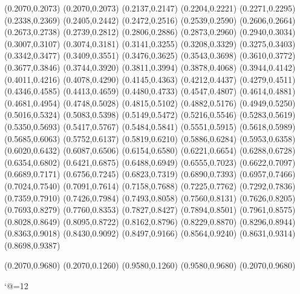 \PST@Dotted(0.2070,0.2073)
(0.2070,0.2073)
(0.2137,0.2147)
(0.2204,0.2221)
(0.2271,0.2295)
(0.2338,0.2369)
(0.2405,0.2442)
(0.2472,0.2516)
(0.2539,0.2590)
(0.2606,0.2664)
(0.2673,0.2738)
(0.2739,0.2812)
(0.2806,0.2886)
(0.2873,0.2960)
(0.2940,0.3034)
(0.3007,0.3107)
(0.3074,0.3181)
(0.3141,0.3255)
(0.3208,0.3329)
(0.3275,0.3403)
(0.3342,0.3477)
(0.3409,0.3551)
(0.3476,0.3625)
(0.3543,0.3698)
(0.3610,0.3772)
(0.3677,0.3846)
(0.3744,0.3920)
(0.3811,0.3994)
(0.3878,0.4068)
(0.3944,0.4142)
(0.4011,0.4216)
(0.4078,0.4290)
(0.4145,0.4363)
(0.4212,0.4437)
(0.4279,0.4511)
(0.4346,0.4585)
(0.4413,0.4659)
(0.4480,0.4733)
(0.4547,0.4807)
(0.4614,0.4881)
(0.4681,0.4954)
(0.4748,0.5028)
(0.4815,0.5102)
(0.4882,0.5176)
(0.4949,0.5250)
(0.5016,0.5324)
(0.5083,0.5398)
(0.5149,0.5472)
(0.5216,0.5546)
(0.5283,0.5619)
(0.5350,0.5693)
(0.5417,0.5767)
(0.5484,0.5841)
(0.5551,0.5915)
(0.5618,0.5989)
(0.5685,0.6063)
(0.5752,0.6137)
(0.5819,0.6210)
(0.5886,0.6284)
(0.5953,0.6358)
(0.6020,0.6432)
(0.6087,0.6506)
(0.6154,0.6580)
(0.6221,0.6654)
(0.6288,0.6728)
(0.6354,0.6802)
(0.6421,0.6875)
(0.6488,0.6949)
(0.6555,0.7023)
(0.6622,0.7097)
(0.6689,0.7171)
(0.6756,0.7245)
(0.6823,0.7319)
(0.6890,0.7393)
(0.6957,0.7466)
(0.7024,0.7540)
(0.7091,0.7614)
(0.7158,0.7688)
(0.7225,0.7762)
(0.7292,0.7836)
(0.7359,0.7910)
(0.7426,0.7984)
(0.7493,0.8058)
(0.7560,0.8131)
(0.7626,0.8205)
(0.7693,0.8279)
(0.7760,0.8353)
(0.7827,0.8427)
(0.7894,0.8501)
(0.7961,0.8575)
(0.8028,0.8649)
(0.8095,0.8722)
(0.8162,0.8796)
(0.8229,0.8870)
(0.8296,0.8944)
(0.8363,0.9018)
(0.8430,0.9092)
(0.8497,0.9166)
(0.8564,0.9240)
(0.8631,0.9314)
(0.8698,0.9387)

\PST@Border(0.2070,0.9680)
(0.2070,0.1260)
(0.9580,0.1260)
(0.9580,0.9680)
(0.2070,0.9680)

\catcode`@=12
\fi
\endpspicture
